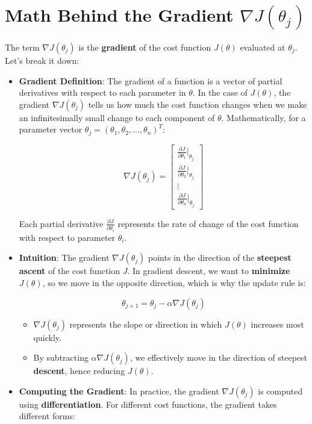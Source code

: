 \documentclass[
  12 pt,
  a4paper,
]{book}
\providecommand{\tightlist}{%
  \setlength{\itemsep}{0pt}\setlength{\parskip}{0pt}}
\numberwithin{equation}{section}
\theoremstyle{plain}      %
\theoremstyle{definition} %
\theoremstyle{remark}     %
\theoremstyle{note}         %
\begin{document}
\hypertarget{math-behind-the-gradient-nabla-jtheta_j}{%
\section{\texorpdfstring{Math Behind the Gradient
\(\nabla J(\theta_j)\)}{Math Behind the Gradient \textbackslash nabla J(\textbackslash theta\_j)}}\label{math-behind-the-gradient-nabla-jtheta_j}}

The term \(\nabla J(\theta_j)\) is the \textbf{gradient} of the cost
function \(J(\theta)\) evaluated at \(\theta_j\). Let's break it down:

\begin{itemize}
\item
  \textbf{Gradient Definition}: The gradient of a function is a vector
  of partial derivatives with respect to each parameter in \(\theta\).
  In the case of \(J(\theta)\), the gradient \(\nabla J(\theta_j)\)
  tells us how much the cost function changes when we make an
  infinitesimally small change to each component of \(\theta\).
  Mathematically, for a parameter vector
  \(\theta_j = (\theta_1, \theta_2, \dots, \theta_n)^T\):

  \[
  \nabla J(\theta_j) = \begin{bmatrix}
  \frac{\partial J}{\partial \theta_1} \Big|_{\theta_j} \\
  \frac{\partial J}{\partial \theta_2} \Big|_{\theta_j} \\
  \vdots \\
  \frac{\partial J}{\partial \theta_n} \Big|_{\theta_j}
  \end{bmatrix}
  \]

  Each partial derivative \(\frac{\partial J}{\partial \theta_i}\)
  represents the rate of change of the cost function with respect to
  parameter \(\theta_i\).
\item
  \textbf{Intuition}: The gradient \(\nabla J(\theta_j)\) points in the
  direction of the \textbf{steepest ascent} of the cost function \(J\).
  In gradient descent, we want to \textbf{minimize} \(J(\theta)\), so we
  move in the opposite direction, which is why the update rule is:

  \[
  \theta_{j+1} = \theta_j - \alpha \nabla J(\theta_j)
  \]

  \begin{itemize}
  \tightlist
  \item
    \(\nabla J(\theta_j)\) represents the slope or direction in which
    \(J(\theta)\) increases most quickly.
  \item
    By subtracting \(\alpha \nabla J(\theta_j)\), we effectively move in
    the direction of steepest \textbf{descent}, hence reducing
    \(J(\theta)\).
  \end{itemize}
\item
  \textbf{Computing the Gradient}: In practice, the gradient
  \(\nabla J(\theta_j)\) is computed using \textbf{differentiation}. For
  different cost functions, the gradient takes different forms:


\end{itemize}
\end{document}
